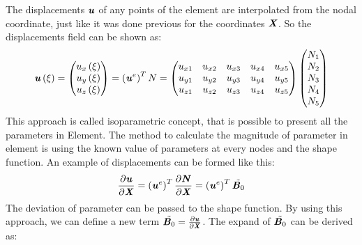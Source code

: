 The displacements $\textbf{\textit{u}}$ of any points of the element are interpolated from the nodal coordinate, just like it was done previous for the coordinates $\textbf{\textit{X}}$. So the displacements field can be shown as:
\begin{equation}
\textbf{\textit{u}}\left(\xi\right) = \begin{pmatrix}
u_x\left(\xi\right) \\
u_y\left(\xi\right) \\
u_z\left(\xi\right) 
\end{pmatrix} = \left(\textbf{\textit{u}}^e\right)^T N = \begin{pmatrix}
u_{x1} & u_{x2} & u_{x3} & u_{x4} & u_{x5} \\
u_{y1} & u_{y2} & u_{y3} & u_{y4} & u_{y5} \\
u_{z1} & u_{z2} & u_{z3} & u_{z4} & u_{z5}
\end{pmatrix} \begin{pmatrix}
N_1 \\
N_2 \\
N_3 \\
N_4 \\
N_5 
\end{pmatrix}
\end{equation}
This approach is called isoparametric concept, that is possible to present all the parameters in Element. The method to calculate the magnitude of parameter in element is using the known value of parameters at every nodes and the shape function. An example of displacements can be formed like this:
\begin{equation}
\frac{\partial \textbf{\textit{u}}}{\partial \textbf{\textit{X}}} = \left(\textbf{\textit{u}}^e\right)^T \frac{\partial \textbf{\textit{N}}}{\partial \textbf{\textit{X}}} = \left(\textbf{\textit{u}}^e\right)^T \tilde{\textbf{\textit{B}}_0}
\end{equation}
The deviation of parameter can be passed to the shape function. By using this approach, we can define a new term $\tilde{\textbf{\textit{B}}_0} = \frac{\partial \textbf{\textit{u}}}{\partial \textbf{\textit{X}}}$. The expand of $\tilde{\textbf{\textit{B}}_0}$ can be derived as:
